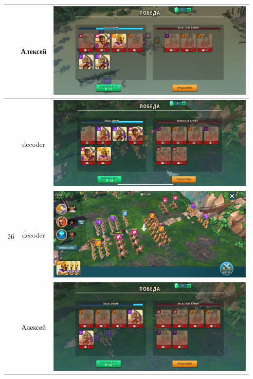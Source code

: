 \begin{longtable}{|c|c|c|}
    & Алексей &
    \includegraphics[width=0.75\linewidth]{./parts/media/TreasureHunt/25/alexey/photo_2022-04-07_10-09-24.jpg} \\
    \hline
    \multirow{4}{*}{26} & decoder &
    \includegraphics[width=0.75\linewidth]{./parts/media/TreasureHunt/26/decoder/photo_2022-04-06_18-11-23.jpg} \\
    & decoder &
    \includegraphics[width=0.75\linewidth]{./parts/media/TreasureHunt/26/decoder/photo_2022-04-06_18-11-14.jpg} \\
    \hline
    \multirow{4}{*}{26} & Алексей &
    \includegraphics[width=0.75\linewidth]{./parts/media/TreasureHunt/26/alexey/photo_2022-04-07_10-09-39.jpg} \\

\end{longtable}
